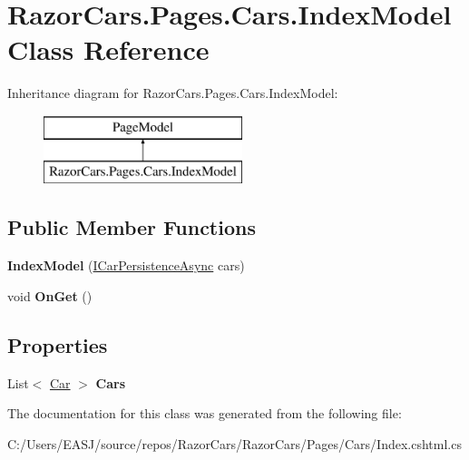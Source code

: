 \hypertarget{class_razor_cars_1_1_pages_1_1_cars_1_1_index_model}{}\section{Razor\+Cars.\+Pages.\+Cars.\+Index\+Model Class Reference}
\label{class_razor_cars_1_1_pages_1_1_cars_1_1_index_model}
Inheritance diagram for Razor\+Cars.\+Pages.\+Cars.\+Index\+Model\+:\begin{figure}[H]
\begin{center}
\leavevmode
\includegraphics[height=2.000000cm]{class_razor_cars_1_1_pages_1_1_cars_1_1_index_model}
\end{center}
\end{figure}
\subsection*{Public Member Functions}
\begin{DoxyCompactItemize}
\item 
\mbox{\label{class_razor_cars_1_1_pages_1_1_cars_1_1_index_model_aad000a1daf10f40b69ca23a275cb9075}} 
{\bfseries Index\+Model} (\mbox{\hyperlink{interface_razor_cars_1_1services_1_1_i_car_persistence_async}{I\+Car\+Persistence\+Async}} cars)
\item 
\mbox{\label{class_razor_cars_1_1_pages_1_1_cars_1_1_index_model_a6abffc99263bd0fe87389852f611f151}} 
void {\bfseries On\+Get} ()
\end{DoxyCompactItemize}
\subsection*{Properties}
\begin{DoxyCompactItemize}
\item 
\mbox{\label{class_razor_cars_1_1_pages_1_1_cars_1_1_index_model_a34b73a9811486f21aa0e9dd2ed928605}} 
List$<$ \mbox{\hyperlink{class_razor_cars_1_1model_1_1_car}{Car}} $>$ {\bfseries Cars}
\end{DoxyCompactItemize}


The documentation for this class was generated from the following file\+:\begin{DoxyCompactItemize}
\item 
C\+:/\+Users/\+E\+A\+S\+J/source/repos/\+Razor\+Cars/\+Razor\+Cars/\+Pages/\+Cars/Index.\+cshtml.\+cs\end{DoxyCompactItemize}
